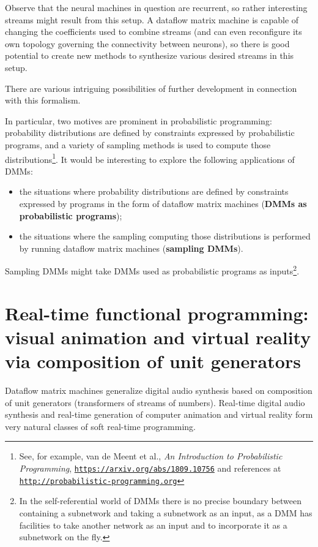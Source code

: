 \documentclass{article}
\begin{document}
Observe that the neural machines in question are recurrent, so rather interesting streams might result from this setup.
A dataflow matrix machine is capable of changing the coefficients used to combine streams (and can even reconfigure its own topology governing the connectivity between neurons),
so there is good potential to create new methods to synthesize various desired streams in this setup.

There are various intriguing possibilities of further development in connection with this formalism.

In particular, two motives are prominent in probabilistic programming: probability distributions are defined
by constraints expressed by probabilistic programs, and a variety of sampling methods is used
to compute those distributions\footnote{See, for example, van  de Meent et al., {\em An Introduction to Probabilistic Programming}, 
\href{https://arxiv.org/abs/1809.10756}{\tt https://arxiv.org/abs/1809.10756} and references at \href{http://probabilistic-programming.org}{\tt http://probabilistic-programming.org} }.
It would be interesting to explore the following applications of DMMs:
  \begin{itemize}
      \item the situations where probability distributions are defined by
constraints expressed by programs in the form of dataflow matrix machines ({\bf DMMs as probabilistic programs});
     \item the situations where the sampling
computing those distributions is performed by running dataflow matrix machines ({\bf sampling DMMs}).
  \end{itemize}
Sampling DMMs might take  DMMs  used as probabilistic programs as inputs\footnote{In 
the self-referential world of DMMs there is no precise boundary between containing a subnetwork and taking a subnetwork as an input, as a DMM has facilities
to take another network as an input and to incorporate it as a subnetwork on the fly.}.


\section{Real-time functional programming: visual animation and virtual reality via composition
of unit generators}

Dataflow matrix machines generalize digital audio synthesis based on composition of unit generators
(transformers of streams of numbers). Real-time digital audio synthesis and real-time generation
of computer animation and virtual reality form very natural classes of soft real-time programming.
\end{document}
